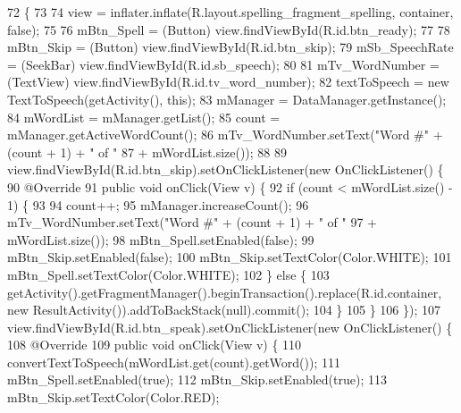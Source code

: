 \begin{DoxyCode}
72                                                                                                       \{
73 
74         view = inflater.inflate(R.layout.spelling\_fragment\_spelling, container, \textcolor{keyword}{false});
75 
76         mBtn\_Spell = (Button) view.findViewById(R.id.btn\_ready);
77 
78         mBtn\_Skip = (Button) view.findViewById(R.id.btn\_skip);
79         mSb\_SpeechRate = (SeekBar) view.findViewById(R.id.sb\_speech);
80 
81         mTv\_WordNumber = (TextView) view.findViewById(R.id.tv\_word\_number);
82         textToSpeech = \textcolor{keyword}{new} TextToSpeech(getActivity(), \textcolor{keyword}{this});
83         mManager = DataManager.getInstance();
84         mWordList = mManager.getList();
85         count = mManager.getActiveWordCount();
86         mTv\_WordNumber.setText(\textcolor{stringliteral}{"Word #"} + (count + 1) + \textcolor{stringliteral}{" of "}
87                 + mWordList.size());
88 
89         view.findViewById(R.id.btn\_skip).setOnClickListener(\textcolor{keyword}{new} OnClickListener() \{
90             @Override
91             \textcolor{keyword}{public} \textcolor{keywordtype}{void} onClick(View v) \{
92                 \textcolor{keywordflow}{if} (count < mWordList.size() - 1) \{
93 
94                     count++;
95                     mManager.increaseCount();
96                     mTv\_WordNumber.setText(\textcolor{stringliteral}{"Word #"} + (count + 1) + \textcolor{stringliteral}{" of "}
97                             + mWordList.size());
98                     mBtn\_Spell.setEnabled(\textcolor{keyword}{false});
99                     mBtn\_Skip.setEnabled(\textcolor{keyword}{false});
100                     mBtn\_Skip.setTextColor(Color.WHITE);
101                     mBtn\_Spell.setTextColor(Color.WHITE);
102                 \} \textcolor{keywordflow}{else} \{
103                     getActivity().getFragmentManager().beginTransaction().replace(R.id.container, \textcolor{keyword}{new} 
      ResultActivity()).addToBackStack(null).commit();
104                 \}
105             \}
106         \});
107         view.findViewById(R.id.btn\_speak).setOnClickListener(\textcolor{keyword}{new} OnClickListener() \{
108             @Override
109             \textcolor{keyword}{public} \textcolor{keywordtype}{void} onClick(View v) \{
110                 convertTextToSpeech(mWordList.get(count).getWord());
111                 mBtn\_Spell.setEnabled(\textcolor{keyword}{true});
112                 mBtn\_Skip.setEnabled(\textcolor{keyword}{true});
113                 mBtn\_Skip.setTextColor(Color.RED);

\end{DoxyCode}
